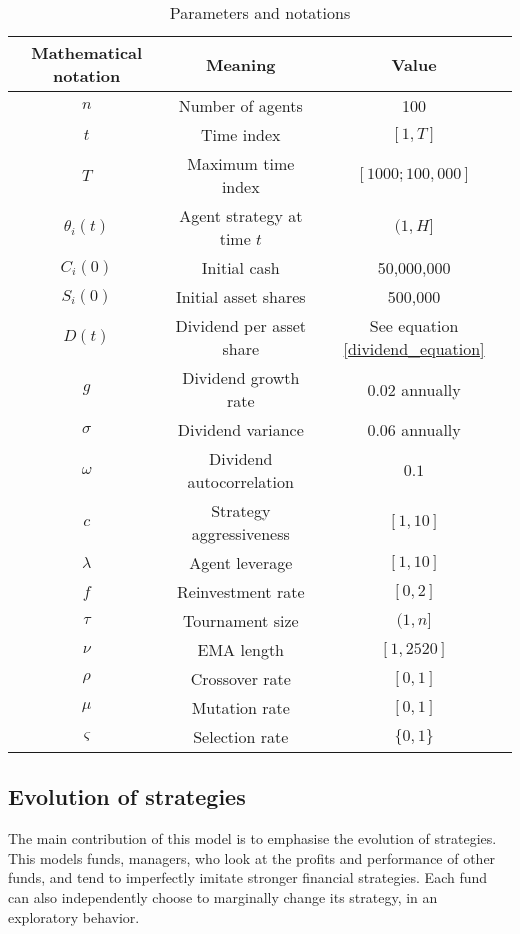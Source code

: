 \documentclass{article}
\begin{document}
\begin{table}[]
    \centering
    \begin{tabular}{c|c|c}
    Mathematical notation & Meaning & Value \\
    \hline
        $n$ & Number of agents & 100 \\
        $t$ & Time index & $[1,T]$\\
        $T$ & Maximum time index & $[1000;100,000]$\\
        $\theta_i(t)$ & Agent strategy at time $t$ & $(1, H]$\\
        $C_i(0)$ & Initial cash & 50,000,000 \\
        $S_i(0)$ & Initial asset shares & 500,000 \\
        $D(t)$ & Dividend per asset share & See equation \ref{dividend_equation} \\
        $g$ & Dividend growth rate & $0.02$ annually \\
        $\sigma$ & Dividend variance & $0.06$ annually \\
        $\omega$ & Dividend autocorrelation & $0.1$ \\
        $c$ & Strategy aggressiveness & $[1,10]$ \\
        $\lambda$ & Agent leverage & $[1,10]$ \\
        $f$ & Reinvestment rate & $[0,2]$ \\
        $\tau$ & Tournament size & $(1,n]$ \\
        $\nu$ & EMA length & $[1,2520]$ \\
        $\rho$ & Crossover rate & $[0,1]$ \\
        $\mu$ & Mutation rate & $[0,1]$ \\
        $\varsigma$ & Selection rate & $\{0,1\}$
    \end{tabular}
    \caption{Parameters and notations}
    \label{parameters_correspondence}
\end{table}

\subsection{Evolution of strategies}
The main contribution of this model is to emphasise the evolution of strategies. This models funds, managers, who look at the profits and performance of other funds, and tend to imperfectly imitate stronger financial strategies. Each fund can also independently choose to marginally change its strategy, in an exploratory behavior.\\
\end{document}
